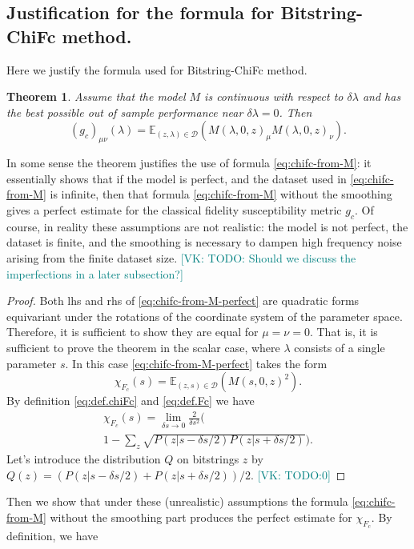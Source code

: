 \documentclass[
  american,aps,pra,reprint,floatfix,nofootinbib,superscriptaddress
]{revtex4-2}
\newtheorem{theorem}{Theorem}
\newcommand{\VK}[1]{\textcolor{teal}{[VK: #1]}}
\begin{document}
\subsection{Justification for the formula for Bitstring-ChiFc method.}
Here we justify the formula used for Bitstring-ChiFc
method.
\begin{theorem}
    Assume that the model $M$ is continuous with respect to
    $\delta \lambda$ and
    has the best possible out of sample performance
    near $\delta \lambda = 0$.
    Then
    \begin{equation}
      \label{eq:chifc-from-M-perfect}
      \left(g_{c}\right)_{\mu\nu}(\lambda) =
        \mathbb{E}_{(z, \lambda) \in \mathcal{D}}
        \left(
          M(\lambda, 0, z)_{\mu}M(\lambda, 0, z)_{\nu}
        \right).
    \end{equation}
\end{theorem}
In some sense the theorem justifies the use of formula
\eqref{eq:chifc-from-M}: it essentially shows that if the model
is perfect, and the dataset used in \eqref{eq:chifc-from-M} is
infinite, then that formula \eqref{eq:chifc-from-M} without the
smoothing gives a perfect estimate for the classical fidelity
susceptibility metric $g_c$. Of course, in reality these assumptions are not realistic: the model is not perfect, the dataset is finite, and the smoothing is necessary to dampen high frequency noise arising from the finite dataset size.
\VK{TODO: Should we discuss the imperfections
in a later subsection?}
\begin{proof}
  Both lhs and rhs of \eqref{eq:chifc-from-M-perfect} are 
  quadratic forms equivariant under the rotations of the 
  coordinate system of the parameter space. Therefore,
  it is sufficient to show they are equal for $\mu = \nu = 0$.
  That is, it is sufficient to prove the theorem in the scalar 
  case, where $\lambda$ consists of a single parameter $s$.
  In this case \eqref{eq:chifc-from-M-perfect} takes the form
  \begin{equation}
      \label{eq:chifc-from-M-perfect-s}
      \chi_{F_c}(s) =
        \mathbb{E}_{(z, s) \in \mathcal{D}} \left(
        M(s, 0, z)^2\right).
  \end{equation}
  By definition \eqref{eq:def.chiFc} and \eqref{eq:def.Fc} we
  have
  \begin{multline}
    \chi_{F_c}(s) = \lim_{\delta s \to 0} \frac{2}{\delta s^2}
    \Biggl(\\
      1-\sum_{z} \sqrt{P(z|s - \delta s / 2) P(z|s+\delta s/2)}
    \Biggr).
  \end{multline}
  Let's introduce the distribution $Q$ on bitstrings $z$
  by $Q(z) = (P(z|s - \delta s / 2) + P(z|s+\delta s/2)) / 2$.
  \VK{TODO:0}
\end{proof}
Then we show that under these (unrealistic) assumptions
the formula \eqref{eq:chifc-from-M}
without the smoothing part produces the perfect estimate for $\chi_{F_c}$.
By definition, we have
\end{document}
